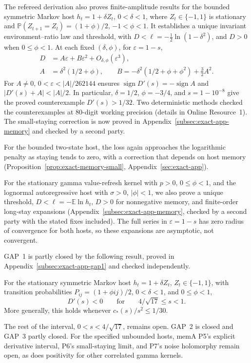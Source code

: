 The refereed derivation also proves finite-amplitude results for the bounded symmetric Markov host $h_t=1+\delta Z_t$, $0<\delta<1$, where $Z_t\in\{-1,1\}$ is stationary and $\mathbb P(Z_{t+1}=Z_t)=(1+\phi)/2$, $-1<\phi<1$. It establishes a unique invariant environment--ratio law and threshold, with $D<\ell=-\tfrac12\ln(1-\delta^2)$, and $D>0$ when $0\leq\phi<1$. At each fixed $(\delta,\phi)$, for $\varepsilon=1-s$,
\begin{equation}
 \begin{split}
 D&=A\varepsilon+B\varepsilon^2+O_{\delta,\phi}(\varepsilon^3),\\
 A&=\delta^2(1/2+\phi),\qquad
 B=-\delta^2(1/2+\phi+\phi^2)+\tfrac32A^2.
 \end{split}\label{eq:exact-memory-long}
\end{equation}
For $A\ne0$, $0<\varepsilon<|A|/262144$ ensures $\operatorname{sign}D'(s)=-\operatorname{sign}A$ and $|D'(s)+A|<|A|/2$. In particular, $\delta=1/2$, $\phi=-3/4$, and $s=1-10^{-8}$ give the proved counterexample $D'(s)>1/32$. Two deterministic methods checked the counterexamples at 80-digit working precision (details in Online Resource~1). The small-staying correction is now proved in Appendix~\ref{subsec:exact-app-memory} and checked by a second party.

For the bounded two-state host, the loss again approaches the logarithmic penalty as staying tends to zero, with a correction that depends on host memory (Proposition~\ref{prop:exact-memory-small}, Appendix~\ref{sec:exact-app}).

For the stationary gamma value-refresh kernel with $p>0$, $0\leq\phi<1$, and the lognormal autoregressive host with $\sigma>0$, $|\phi|<1$, we also prove a unique threshold, $D<\ell=-\mathbb E\ln h_t$, $D>0$ for nonnegative memory, and finite-order long-stay expansions (Appendix~\ref{subsec:exact-app-memory}, checked by a second party with the stated fixes included). The full series in $\varepsilon=1-s$ has zero radius of convergence for both hosts, so these expansions are asymptotic, not convergent.

GAP~1 is partly closed by the following result, proved in Appendix~\ref{subsec:exact-app-gap1} and checked independently.
\begin{proposition}\label{prop:exact-memory-uniform}
For the stationary symmetric Markov host \(h_t=1+\delta Z_t\), \(Z_t\in\{-1,1\}\), with transition probabilities \(P_{ij}=(1+\phi ij)/2\), \(0<\delta<1\), and \(0\leq\phi<1\),
\begin{equation}\label{eq:exact-memory-uniform}
 D'(s)<0\qquad\text{for}\qquad 4/\sqrt{17}\leq s<1.
\end{equation}
More generally, this holds whenever \(c_*(s)/s^2\leq1/30\).
\end{proposition}
The rest of the interval, \(0<s<4/\sqrt{17}\), remains open. GAP~2 is closed and GAP~3 partly closed. For the specified unbounded hosts, memA P5's explicit derivative interval, P6's small-staying limit, and P7's noise holomorphy remain open, as does positivity for other correlated gamma kernels.

